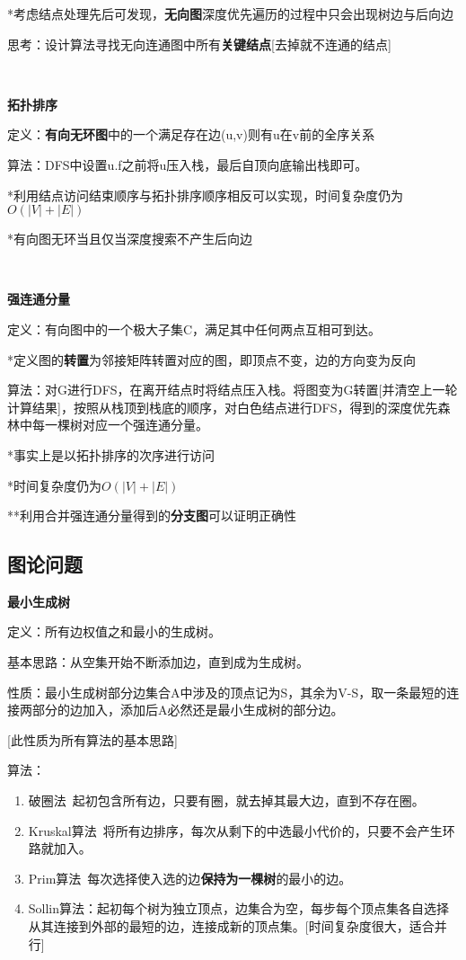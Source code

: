 \documentclass[a4paper,UTF8,fontset=windows]{ctexart}
\begin{document}
*\hspace{0em}考虑结点处理先后可发现，\textbf{无向图}深度优先遍历的过程中只会出现树边与后向边

思考：设计算法寻找无向连通图中所有\textbf{关键结点}[去掉就不连通的结点]

\

\textbf{拓扑排序}

定义：\textbf{有向无环图}中的一个满足存在边(u,v)则有u在v前的全序关系

算法：DFS中设置u.f之前将u压入栈，最后自顶向底输出栈即可。

*\hspace{0em}利用结点访问结束顺序与拓扑排序顺序相反可以实现，时间复杂度仍为$O(|V|+|E|)$

*\hspace{0em}有向图无环当且仅当深度搜索不产生后向边

\

\textbf{强连通分量}

定义：有向图中的一个极大子集C，满足其中任何两点互相可到达。

*\hspace{0em}定义图的\textbf{转置}为邻接矩阵转置对应的图，即顶点不变，边的方向变为反向

算法：对G进行DFS，在离开结点时将结点压入栈。将图变为G转置[并清空上一轮计算结果]，按照从栈顶到栈底的顺序，对白色结点进行DFS，得到的深度优先森林中每一棵树对应一个强连通分量。

*\hspace{0em}事实上是以拓扑排序的次序进行访问

*\hspace{0em}时间复杂度仍为$O(|V|+|E|)$

**\hspace{0em}利用合并强连通分量得到的\textbf{分支图}可以证明正确性

\subsection{图论问题}
\textbf{最小生成树}

定义：所有边权值之和最小的生成树。

基本思路：从空集开始不断添加边，直到成为生成树。

性质：最小生成树部分边集合A中涉及的顶点记为S，其余为V-S，取一条最短的连接两部分的边加入，添加后A必然还是最小生成树的部分边。

[此性质为所有算法的基本思路]

算法：
\begin{enumerate}
    \item 破圈法\ 起初包含所有边，只要有圈，就去掉其最大边，直到不存在圈。
    \item Kruskal\hspace{0em}算法\ 将所有边排序，每次从剩下的中选最小代价的，只要不会产生环路就加入。
    \item Prim\hspace{0em}算法\ 每次选择使入选的边\textbf{保持为一棵树}的最小的边。
    \item Sollin\hspace{0em}算法：起初每个树为独立顶点，边集合为空，每步每个顶点集各自选择从其连接到外部的最短的边，连接成新的顶点集。[时间复杂度很大，适合并行]
\end{enumerate}
\end{document}
